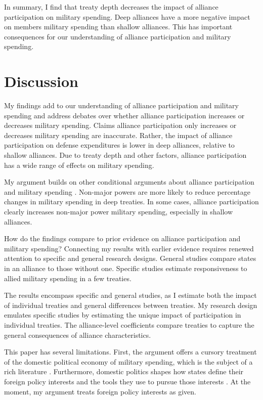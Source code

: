 \documentclass[12pt]{article}
\begin{document}
In summary, I find that treaty depth decreases the impact of alliance participation on military spending. 
Deep alliances have a more negative impact on members military spending than shallow alliances. 
This has important consequences for our understanding of alliance participation and military spending. 



\section{Discussion}


My findings add to our understanding of alliance participation and military spending and address debates over whether alliance participation increases or decreases military spending. 
Claims alliance participation only increases or decreases military spending are inaccurate. 
Rather, the impact of alliance participation on defense expenditures is lower in deep alliances, relative to shallow alliances.
Due to treaty depth and other factors, alliance participation has a wide range of effects on military spending. 


My argument builds on other conditional arguments about alliance participation and military spending \citep{DigiuseppePoast2016}. 
Non-major powers are more likely to reduce percentage changes in military spending in deep treaties.
In some cases, alliance participation clearly increases non-major power military spending, especially in shallow alliances. 


How do the findings compare to prior evidence on alliance participation and military spending? 
Connecting my results with earlier evidence requires renewed attention to specific and general research designs. 
General studies compare states in an alliance to those without one. 
Specific studies estimate responsiveness to allied military spending in a few treaties. 


The results encompass specific and general studies, as I estimate both the impact of individual treaties and general differences between treaties. 
My research design emulates specific studies by estimating the unique impact of participation in individual treaties. 
The alliance-level coefficients compare treaties to capture the general consequences of alliance characteristics. 


This paper has several limitations.
First, the argument offers a cursory treatment of the domestic political economy of military spending, which is the subject of a rich literature \citep{WhittenWilliams2011, AlptekinLevine2012}.  
Furthermore, domestic politics shapes how states define their foreign policy interests and the tools they use to pursue those interests \citep{Fordham1998, Fordham2011, Narizny2007}. 
At the moment, my argument treats foreign policy interests as given.  
\end{document}
